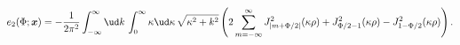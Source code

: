 \begin{equation}
\label{58}
e_2(\Phi;\boldsymbol{x})=-\frac{1}{2\pi^2}\int_{-\infty}^\infty
\ud k\,\int_0^\infty\kappa
\ud\kappa\,\sqrt{\kappa^2+k^2}\left(2\sum\limits_{m=-\infty}^\infty
J^2_{|m+\Phi/2|}(\kappa\rho)+J^2_{\Phi/2-1}(\kappa\rho)
-J^2_{1-\Phi/2}(\kappa\rho)\right).
\end{equation}

